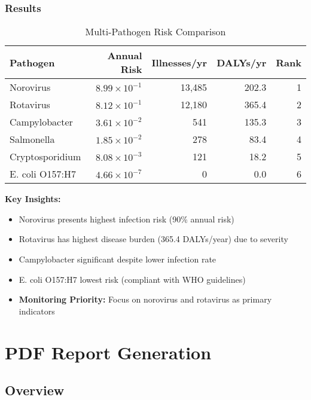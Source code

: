 \documentclass[11pt,a4paper]{article}
\begin{document}
\subsubsection{Results}

\begin{table}[H]
\centering
\caption{Multi-Pathogen Risk Comparison}
\begin{tabular}{lrrrr}
\toprule
\textbf{Pathogen} & \textbf{Annual Risk} & \textbf{Illnesses/yr} & \textbf{DALYs/yr} & \textbf{Rank} \\
\midrule
Norovirus & $8.99 \times 10^{-1}$ & 13,485 & 202.3 & 1 \\
Rotavirus & $8.12 \times 10^{-1}$ & 12,180 & 365.4 & 2 \\
Campylobacter & $3.61 \times 10^{-2}$ & 541 & 135.3 & 3 \\
Salmonella & $1.85 \times 10^{-2}$ & 278 & 83.4 & 4 \\
Cryptosporidium & $8.08 \times 10^{-3}$ & 121 & 18.2 & 5 \\
E. coli O157:H7 & $4.66 \times 10^{-7}$ & 0 & 0.0 & 6 \\
\bottomrule
\end{tabular}
\end{table}

\textbf{Key Insights:}
\begin{itemize}[leftmargin=*]
    \item Norovirus presents highest infection risk (90\% annual risk)
    \item Rotavirus has highest disease burden (365.4 DALYs/year) due to severity
    \item Campylobacter significant despite lower infection rate
    \item E. coli O157:H7 lowest risk (compliant with WHO guidelines)
    \item \textbf{Monitoring Priority:} Focus on norovirus and rotavirus as primary indicators
\end{itemize}

\newpage

\section{PDF Report Generation}

\subsection{Overview}
\end{document}
